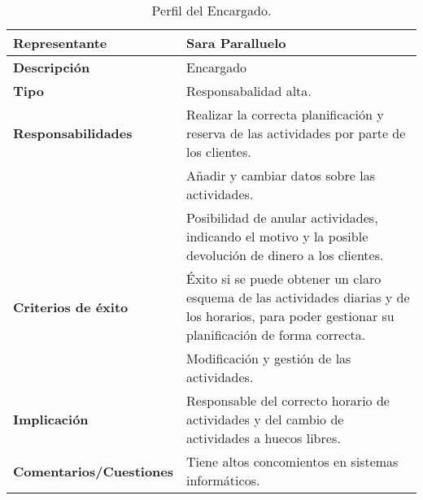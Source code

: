 \begin{table}
    \centering
    \begin{tabular}{|p{5cm}|p{10cm}|}
        \hline
        \cellcolor[HTML]{FFCCC9}\textbf{Representante} & Sara Paralluelo \\ \hline
        \cellcolor[HTML]{FFCCC9}\textbf{Descripción} & Encargado \\ \hline
        \cellcolor[HTML]{FFCCC9}\textbf{Tipo} & Responsabalidad alta. \\ \hline
        \cellcolor[HTML]{FFCCC9}\textbf{Responsabilidades} & Realizar la correcta planificación y reserva de las actividades por parte de los clientes. \\ \cellcolor[HTML]{FFCCC9}& Añadir y cambiar datos sobre las actividades. \\ \cellcolor[HTML]{FFCCC9}& Posibilidad de anular actividades, indicando el motivo y la posible devolución de dinero a los clientes. \\ \hline
        \cellcolor[HTML]{FFCCC9}\textbf{Criterios de éxito} & Éxito si se puede obtener un claro esquema de las actividades diarias y de los horarios, para poder gestionar su planificación de forma correcta.\\ \cellcolor[HTML]{FFCCC9}& Modificación y gestión de las actividades. \\ \hline
        \cellcolor[HTML]{FFCCC9}\textbf{Implicación} & Responsable del correcto horario de actividades y del cambio de actividades a huecos libres. \\ \hline
        \cellcolor[HTML]{FFCCC9}\textbf{Comentarios/Cuestiones} & Tiene altos concomientos en sistemas informáticos. \\ \hline
    \end{tabular}
    \caption{Perfil del Encargado.}
    \label{tab:per-encargado}
\end{table}

